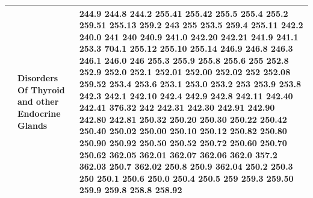 \documentclass[3p,super,numbers,sort&compress,preprint,10pt]{elsarticle}
\begin{document}
\begin{longtable}{|L{.1in}|L{.6in}||L{5.65in}|}
   & Disorders Of Thyroid and other Endocrine Glands &  244.9 244.8 244.2 255.41 255.42 255.5 255.4 255.2 259.51 255.13 259.2 243 255 253.5 259.4 255.11 242.2 240.0 241 240 240.9 241.0 242.20 242.21 241.9 241.1 253.3 704.1 255.12 255.10 255.14 246.9 246.8 246.3 246.1 246.0 246 255.3 255.9 255.8 255.6 255 252.8 252.9 252.0 252.1 252.01 252.00 252.02 252 252.08 259.52 253.4 253.6 253.1 253.0 253.2 253 253.9 253.8 242.3 242.1 242.10 242.4 242.9 242.8 242.11 242.40 242.41 376.32 242 242.31 242.30 242.91 242.90 242.80 242.81 250.32 250.20 250.30 250.22 250.42 250.40 250.02 250.00 250.10 250.12 250.82 250.80 250.90 250.92 250.50 250.52 250.72 250.60 250.70 250.62 362.05 362.01 362.07 362.06 362.0 357.2 362.03 250.7 362.02 250.8 250.9 362.04 250.2 250.3 250 250.1 250.6 250.0 250.4 250.5 259 259.3 259.50 259.9 259.8 258.8 258.92\\\hline

\end{longtable}
\end{document}
